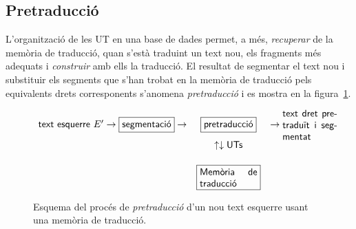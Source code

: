 \subsection{Pretraducció}

L'organització de les UT en una base de dades permet, a més,
\emph{recuperar} de la memòria de traducció, quan s'està traduint un
text nou, els fragments més adequats i \emph{construir} amb ells la
traducció. El resultat de segmentar el text nou i substituir els
segments que s'han trobat en la memòria de traducció pels equivalents
drets corresponents s'anomena \emph{pretraducció} i es mostra en la
figura~\ref{fg:preMT}.
\begin{figure}
$$
\begin{array}{rcl}
\mbox{\textsf{text esquerre $E'$}} \to
\mbox{\framebox{\textsf{segmentació}}} \to &
\mbox{\framebox{\textsf{pretraducció}}} & \to \mbox{\parbox{2cm}{\textsf{text dret
    pretraduït i segmentat}}} \\
& \uparrow \downarrow \mbox{\textsf{UTs}}& \\[0.5cm]
& \mbox{\framebox{\parbox{2.1cm}{\textsf{Memòria de traducció}}}} & \\
\end{array}
$$
\caption{Esquema del procés de \emph{pretraducció} d'un nou text esquerre usant
  una memòria de traducció.}
\label{fg:preMT}
\end{figure}

